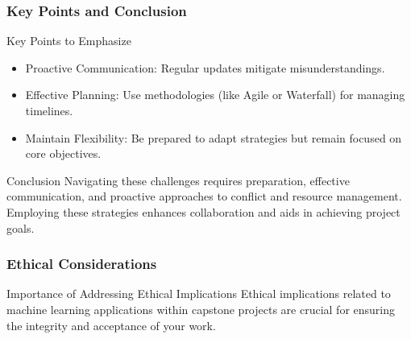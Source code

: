 \documentclass[aspectratio=169]{beamer}
\begin{document}
\begin{frame}[fragile]
    \frametitle{Key Points and Conclusion}

    \begin{block}{Key Points to Emphasize}
        \begin{itemize}
            \item Proactive Communication: Regular updates mitigate misunderstandings.
            \item Effective Planning: Use methodologies (like Agile or Waterfall) for managing timelines.
            \item Maintain Flexibility: Be prepared to adapt strategies but remain focused on core objectives.
        \end{itemize}
    \end{block}

    \begin{block}{Conclusion}
        Navigating these challenges requires preparation, effective communication, and proactive approaches to conflict and resource management. Employing these strategies enhances collaboration and aids in achieving project goals.
    \end{block}
\end{frame}

\begin{frame}[fragile]
    \frametitle{Ethical Considerations}
    \begin{block}{Importance of Addressing Ethical Implications}
        Ethical implications related to machine learning applications within capstone projects are crucial for ensuring the integrity and acceptance of your work.
    \end{block}
\end{frame}
\end{document}
